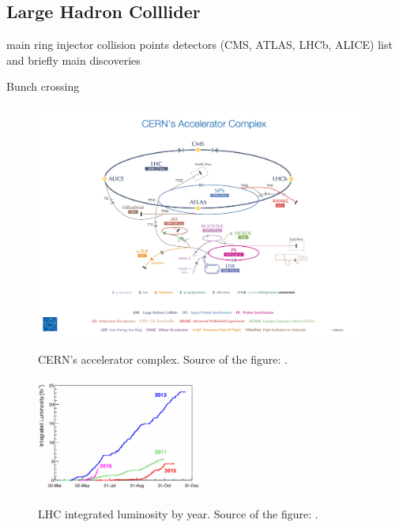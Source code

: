 \subsection{Large Hadron Colllider}
main ring
injector
collision points
detectors (CMS, ATLAS, LHCb, ALICE)
list and briefly main discoveries 

Bunch crossing

\begin{figure}[htb]
  \begin{center}
    {\includegraphics[width=0.98\textwidth]{../figs/Exp/CERN_accelerator_complex2013.jpg}}
    \caption{CERN's accelerator complex. Source of the figure: \cite{ref_fig_CERNacceleratorComplex}.}
    \label{fig:SMtable}
  \end{center}
\end{figure}

\begin{figure}[htb]
  \begin{center}
    {\includegraphics[width=0.5\textwidth]{../figs/Exp/LHC_lumi.png}}
    \caption{LHC integrated luminosity by year. Source of the figure: \cite{ref_fig_LHClumi}.}
    \label{fig:SMtable}
  \end{center}
\end{figure}


